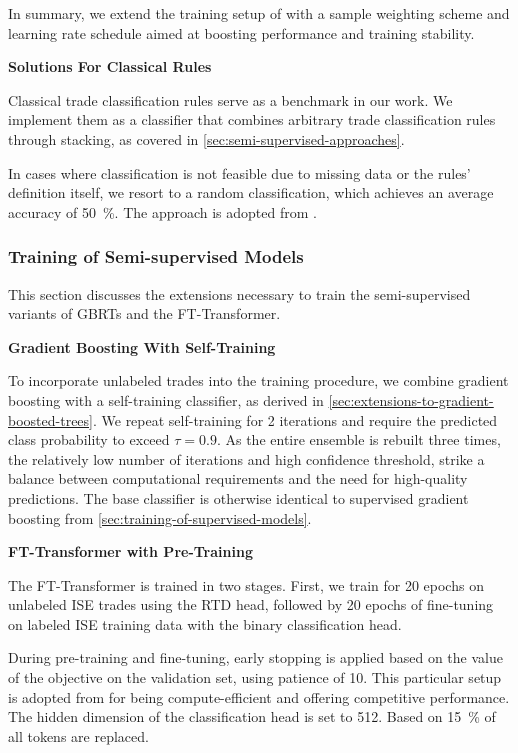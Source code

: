 In summary, we extend the training setup of \textcite[][6]{gorishniyRevisitingDeepLearning2021} with a sample weighting scheme and learning rate schedule aimed at boosting performance and training stability.

\textbf{Solutions For Classical Rules}

Classical trade classification rules serve as a benchmark in our work. We implement them as a classifier that combines arbitrary trade classification rules through stacking, as covered in \cref{sec:semi-supervised-approaches}.

In cases where classification is not feasible due to missing data or the rules' definition itself, we resort to a random classification, which achieves an average accuracy of \SI{50}{\percent}. The approach is adopted from \textcite[][887]{savickasInferringDirectionOption2003}.

\subsubsection{Training of Semi-supervised
    Models}\label{sec:training-of-semi-supervised-models}

This section discusses the extensions necessary to train the semi-supervised variants of \glspl{GBRT} and the FT-Transformer.

\textbf{Gradient Boosting With Self-Training}

To incorporate unlabeled trades into the training procedure, we combine gradient boosting with a self-training classifier, as derived in \cref{sec:extensions-to-gradient-boosted-trees}. We repeat self-training for 2 iterations and require the predicted class probability to exceed $\tau=0.9$. As the entire ensemble is rebuilt three times, the relatively low number of iterations and high confidence threshold, strike a balance between computational requirements and the need for high-quality predictions. The base classifier is otherwise identical to supervised gradient boosting from \cref{sec:training-of-supervised-models}.

\textbf{FT-Transformer with Pre-Training}

The FT-Transformer is trained in two stages. First, we train for \num{20} epochs on unlabeled \gls{ISE} trades using the \gls{RTD} head, followed by \num{20} epochs of fine-tuning on labeled \gls{ISE} training data with the binary classification head.

During pre-training and fine-tuning, early stopping is applied based on the value of the objective on the validation set, using patience of \num{10}. This particular setup is adopted from \textcite[][15]{rubachevRevisitingPretrainingObjectives2022} for being compute-efficient and offering competitive performance. The hidden dimension of the classification head is set to \num{512}. Based on \textcite[][3]{clarkElectraPretrainingText2020} \SI{15}{\percent} of all tokens are replaced. 

